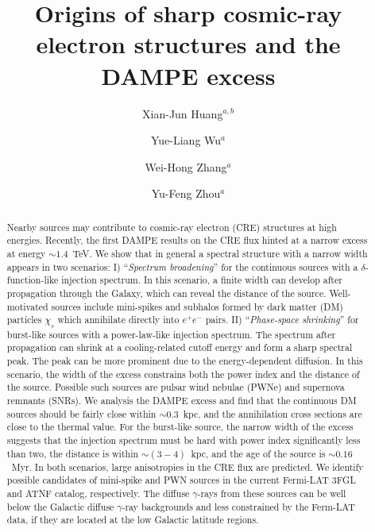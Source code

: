 \documentclass[aps,prl,twocolumn,a4paper]{revtex4}
\begin{document}
\title{Origins of  sharp cosmic-ray electron  structures and the DAMPE excess}
\author{Xian-Jun Huang$^{a,b}$}
\author{Yue-Liang Wu$^{a}$}
\author{Wei-Hong Zhang$^{a}$}
\author{Yu-Feng Zhou$^{a}$}
\begin{abstract}
Nearby sources  may contribute to cosmic-ray electron  (CRE) structures 
at high energies.
Recently, the first  DAMPE results on the CRE flux hinted at 
a  narrow  excess 
at   energy $\sim 1.4$~TeV.  
We show that in general a  spectral structure with a narrow width 
appears  in two scenarios:
I) ``{\it Spectrum broadening}'' for the continuous sources 
with a $\delta$-function-like  injection spectrum.
In this scenario, %
a finite width can develop after propagation through the Galaxy,
which
can reveal %
the distance of the source.
Well-motivated   sources include mini-spikes and subhalos formed 
by dark matter (DM) particles $\chi_{s}$ which annihilate directly into $e^{+}e^{-}$ pairs.
II) ``{\it Phase-space shrinking}'' for burst-like sources with a power-law-like injection spectrum.
The  spectrum after propagation can shrink at a cooling-related cutoff energy 
and form a sharp spectral peak.
The peak can be  more prominent due to the energy-dependent diffusion.
In this scenario, the width of the excess constrains both 
the power index and the distance of the source.
Possible such sources are pulsar wind nebulae (PWNe) and supernova remnants (SNRs).
We analysis the DAMPE excess and find that 
the continuous DM sources should be fairly close within $\sim 0.3$~kpc, 
and the annihilation cross sections are close to 
the thermal value.
For the burst-like source, 
the narrow width of the excess suggests that 
the injection spectrum must be  hard 
with power index significantly less than two, 
the distance is within $\sim(3-4)$~kpc, and
the age of the source is  $\sim 0.16$~Myr.
In both scenarios,  
large  anisotropies  in the CRE flux are predicted. 
We identify possible candidates of mini-spike and PWN sources
in the current Fermi-LAT 3FGL and ATNF catalog, respectively.
The diffuse $\gamma$-rays from these sources
can be well below the Galactic diffuse $\gamma$-ray backgrounds
and less constrained by the Ferm-LAT data,
if they are located at the low Galactic latitude regions.	
\end{abstract}
\preprint{ [\today ]}
\maketitle %
\end{document}
